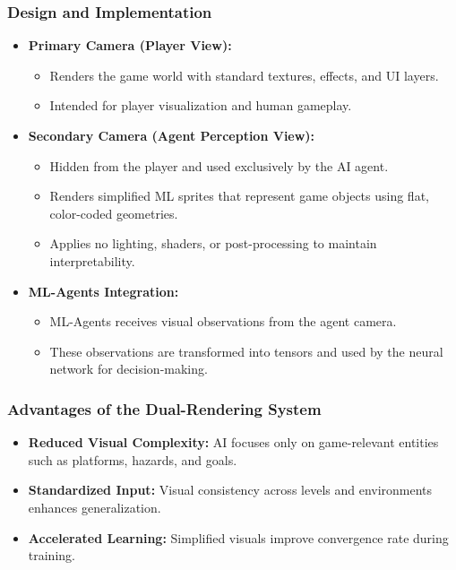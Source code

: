\documentclass[12pt,oneside,openright,a4paper]{cpe-english-project}
\begin{document}
\subsubsection{Design and Implementation}
\begin{itemize}
\item \textbf{Primary Camera (Player View):}
\begin{itemize}
\item Renders the game world with standard textures, effects, and UI layers.
\item Intended for player visualization and human gameplay.
\end{itemize}
\item \textbf{Secondary Camera (Agent Perception View):}
\begin{itemize}
    \item Hidden from the player and used exclusively by the AI agent.
    \item Renders simplified ML sprites that represent game objects using flat, color-coded geometries.
    \item Applies no lighting, shaders, or post-processing to maintain interpretability.
\end{itemize}

\item \textbf{ML-Agents Integration:}
\begin{itemize}
    \item ML-Agents receives visual observations from the agent camera.
    \item These observations are transformed into tensors and used by the neural network for decision-making.
\end{itemize}
\end{itemize}
\subsubsection{Advantages of the Dual-Rendering System}
\begin{itemize}
\item \textbf{Reduced Visual Complexity:} AI focuses only on game-relevant entities such as platforms, hazards, and goals.
\item \textbf{Standardized Input:} Visual consistency across levels and environments enhances generalization.
\item \textbf{Accelerated Learning:} Simplified visuals improve convergence rate during training.
\end{itemize}
\end{document}
